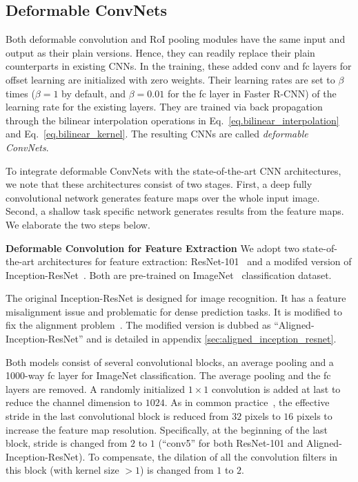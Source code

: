 \documentclass[10pt,twocolumn,letterpaper]{article}
\begin{document}
\subsection{Deformable ConvNets}
\label{sec.deformable_convnets}

Both deformable convolution and RoI pooling modules have the same input and output as their plain versions. Hence, they can readily replace their plain counterparts in existing CNNs. In the training, these added conv and fc layers for offset learning are initialized with zero weights. Their learning rates are set to $\beta$ times ($\beta = 1$ by default, and $\beta = 0.01$ for the fc layer in Faster R-CNN) of the learning rate for the existing layers. They are trained via back propagation through the bilinear interpolation operations in Eq.~\eqref{eq.bilinear_interpolation} and Eq.~\eqref{eq.bilinear_kernel}. The resulting CNNs are called \emph{deformable ConvNets}.

To integrate deformable ConvNets with the state-of-the-art CNN architectures, we note that these architectures consist of two stages. First, a deep fully convolutional network generates feature maps over the whole input image. Second, a shallow task specific network generates results from the feature maps. We elaborate the two steps below.

\textbf{Deformable Convolution for Feature Extraction} We adopt two state-of-the-art architectures for feature extraction: ResNet-101~\cite{he2016deep} and a modifed version of Inception-ResNet~\cite{szegedy2016inception}. Both are pre-trained on ImageNet~\cite{deng2009imagenet} classification dataset.

The original Inception-ResNet is designed for image recognition. It has a feature misalignment issue and problematic for dense prediction tasks. It is modified to fix the alignment problem~\cite{he2016aligned}. The modified version is dubbed as ``Aligned-Inception-ResNet'' and is detailed in appendix \ref{sec:aligned_inception_resnet}.

Both models consist of several convolutional blocks, an average pooling and a 1000-way fc layer for ImageNet classification. The average pooling and the fc layers are removed. A randomly initialized $1 \times 1$ convolution is added at last to reduce the channel dimension to $1024$. As in common practice~\cite{chen2015semantic,dai2016rfcn}, the effective stride in the last convolutional block is reduced from $32$ pixels to $16$ pixels to increase the feature map resolution. Specifically, at the beginning of the last block, stride is changed from $2$ to $1$ (``conv5'' for both ResNet-101 and Aligned-Inception-ResNet). To compensate, the dilation of all the convolution filters in this block (with kernel size $>1$) is changed from $1$ to $2$.
\end{document}
